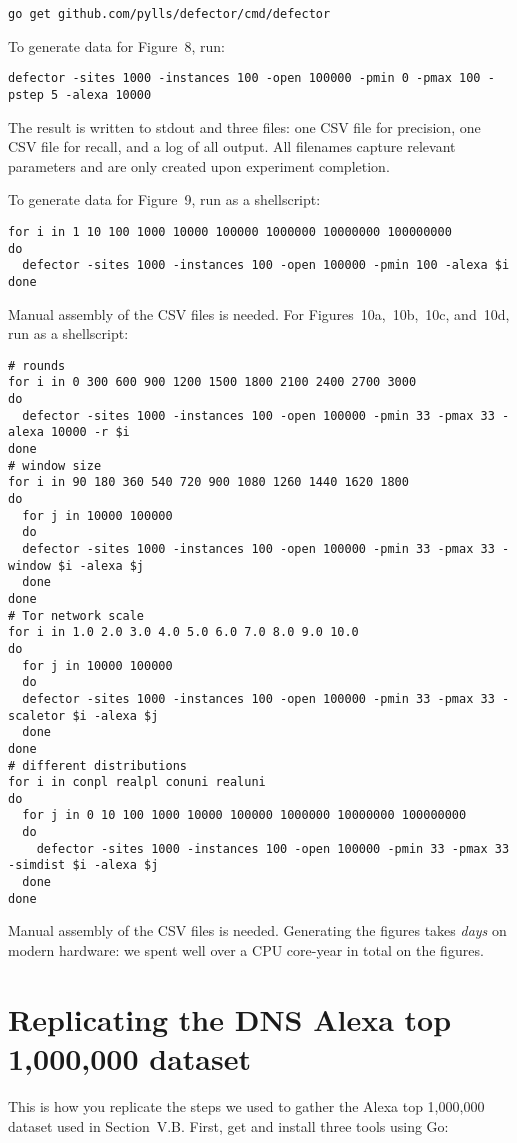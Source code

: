 \documentclass{article}
\begin{document}
\begin{lstlisting}
go get github.com/pylls/defector/cmd/defector
\end{lstlisting}

To generate data for Figure~8, run:

\begin{lstlisting}
defector -sites 1000 -instances 100 -open 100000 -pmin 0 -pmax 100 -pstep 5 -alexa 10000
\end{lstlisting}

The result is written to stdout and three files: one CSV file for precision,
one CSV file for recall, and a log of all output. All filenames capture relevant
parameters and are only created upon experiment completion.

To generate data for Figure~9, run as a shellscript:

\begin{lstlisting}
for i in 1 10 100 1000 10000 100000 1000000 10000000 100000000
do
  defector -sites 1000 -instances 100 -open 100000 -pmin 100 -alexa $i
done
\end{lstlisting}

Manual assembly of the CSV files is needed. For Figures~10a,~10b,~10c, and~10d,
run as a shellscript:

\begin{lstlisting}
# rounds
for i in 0 300 600 900 1200 1500 1800 2100 2400 2700 3000
do
  defector -sites 1000 -instances 100 -open 100000 -pmin 33 -pmax 33 -alexa 10000 -r $i
done
# window size
for i in 90 180 360 540 720 900 1080 1260 1440 1620 1800
do
  for j in 10000 100000
  do
  defector -sites 1000 -instances 100 -open 100000 -pmin 33 -pmax 33 -window $i -alexa $j
  done
done
# Tor network scale
for i in 1.0 2.0 3.0 4.0 5.0 6.0 7.0 8.0 9.0 10.0
do
  for j in 10000 100000
  do
  defector -sites 1000 -instances 100 -open 100000 -pmin 33 -pmax 33 -scaletor $i -alexa $j
  done
done
# different distributions
for i in conpl realpl conuni realuni
do
  for j in 0 10 100 1000 10000 100000 1000000 10000000 100000000
  do
    defector -sites 1000 -instances 100 -open 100000 -pmin 33 -pmax 33 -simdist $i -alexa $j
  done
done
\end{lstlisting}

Manual assembly of the CSV files is needed.
Generating the figures takes \emph{days} on modern
hardware: we spent well over a CPU core-year in total on the figures.

\section{Replicating the DNS Alexa top 1,000,000 data\-set}
This is how you replicate the steps we used to gather the Alexa top 1,000,000
dataset used in Section~V.B.  First, get and install three tools using Go:
\end{document}
